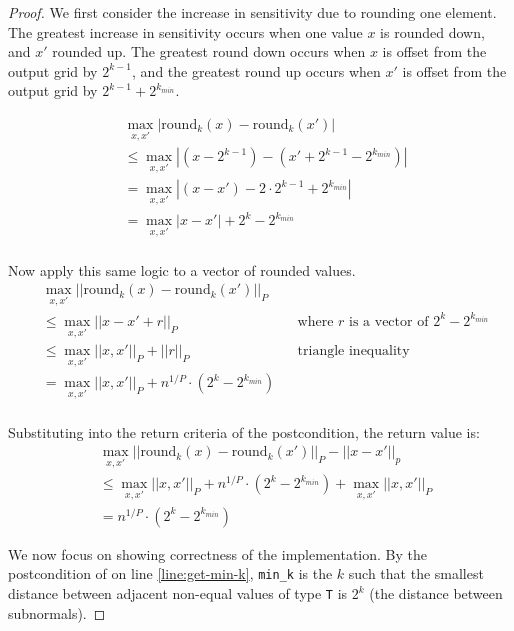 \documentclass{article}
\begin{document}
\begin{proof}
    We first consider the increase in sensitivity due to rounding one element.
    The greatest increase in sensitivity occurs when one value $x$ is rounded down, and $x'$ rounded up.
    The greatest round down occurs when $x$ is offset from the output grid by $2^{k-1}$,
    and the greatest round up occurs when $x'$ is offset from the output grid by $2^{k-1} + 2^{k_{min}}$.

    \begin{align}
        &\max_{x, x'} |\mathrm{round}_k(x) - \mathrm{round}_k(x')| \\
        &\leq \max_{x, x'} |(x - 2^{k - 1}) - (x' + 2^{k - 1} - 2^{k_{min}})| \\
        &= \max_{x, x'} |(x - x') - 2 \cdot 2^{k - 1} + 2^{k_{min}}| \\
        &= \max_{x, x'} |x - x'| + 2^{k} - 2^{k_{min}} \\
    \end{align}
    
    Now apply this same logic to a vector of rounded values.
    \begin{align}
        &\max_{x, x'} ||\mathrm{round}_k(x) - \mathrm{round}_k(x')||_P \\
        &\leq \max_{x, x'} ||x - x' + r||_P &&\text{where } r \text{ is a vector of } 2^k - 2^{k_{min}} \\
        &\leq \max_{x, x'} ||x, x'||_P + ||r||_P &&\text{triangle inequality} \\
        &= \max_{x, x'} ||x, x'||_P + n^{1/P} \cdot (2^k - 2^{k_{min}}) \\
    \end{align}

    Substituting into the return criteria of the postcondition, the return value is:
    \begin{align}
        &\max_{x, x'} ||\mathrm{round}_k(x) - \mathrm{round}_k(x')||_P - ||x - x'||_p \\
        &\leq \max_{x, x'} ||x, x'||_P + n^{1/P} \cdot (2^k - 2^{k_{min}})  + \max_{x, x'} ||x, x'||_P\\
        &= n^{1/P} \cdot (2^k - 2^{k_{min}})
    \end{align}
    
    We now focus on showing correctness of the implementation.
    By the postcondition of  on line \ref{line:get-min-k},
    \texttt{min\_k} is the $k$ such that the smallest distance between adjacent non-equal values of type \texttt{T} is $2^k$
    (the distance between subnormals).


\end{proof}
\end{document}
